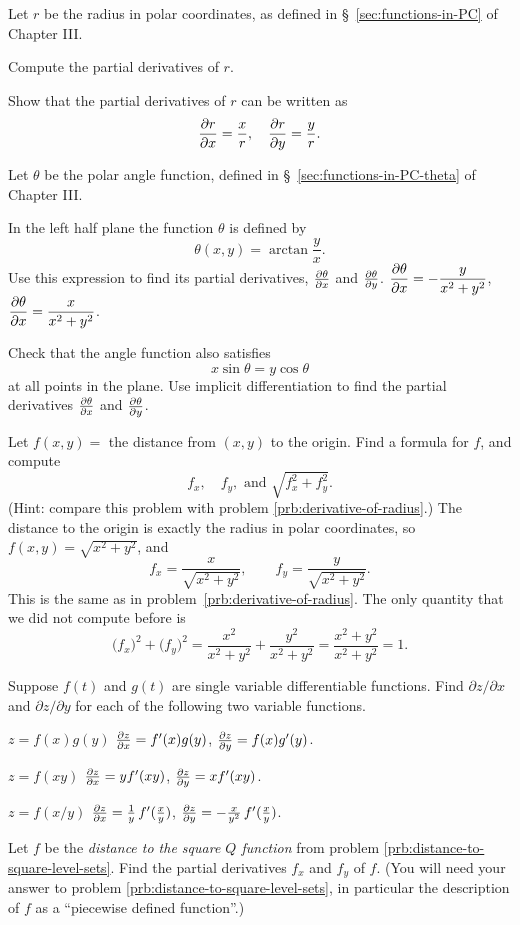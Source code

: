 \begin{multicols}{2}
\problem \label{prb:derivative-of-radius}%
Let $r$ be the radius in polar coordinates, as defined in
\S~\ref{sec:functions-in-PC} of Chapter III.

\subprob Compute the partial derivatives of $r$.

\subprob Show that the partial derivatives of $r$ can be written as
\[
\frac{\partial r}{\partial x} = \frac xr, \quad
\frac{\partial r}{\partial y} = \frac yr.
\]

\problem \label{prb:derivative-of-theta}%
Let $\theta$ be the polar angle function, defined in
\S~\ref{sec:functions-in-PC-theta} of Chapter III.

\subprob In the left half plane the function $\theta$ is defined by
\[
\theta(x,y) = \arctan\frac{y} {x}.
\]
Use this expression to find its partial derivatives, $\frac{\partial \theta}{\partial x}$ and $\frac{\partial \theta}{\partial y}$.
\answer
$\displaystyle\frac{\partial \theta}{\partial x} = -\frac{y} {x^2+y^2}$, $\displaystyle\frac{\partial \theta}{\partial x} = \frac{x} {x^2+y^2}$.
\endanswer

\subprob Check that the angle function also satisfies
\[
x\sin\theta = y\cos \theta
\]
at all points in the plane.  Use implicit differentiation to find the partial
derivatives $\frac{\partial \theta}{\partial x}$ and $\frac{\partial \theta}{\partial y}$.


\problem Let $f(x, y) = $ the distance from $(x,y)$ to the origin. 
Find a formula for $f$, and compute
\[
f_x, \quad f_y, \text{ and } \sqrt{f_x^2 +f_y^2}.
\]
(Hint: compare this problem with problem \ref{prb:derivative-of-radius}.)
\answer
The distance to the origin is exactly the radius in polar coordinates, so
$f(x, y) = \sqrt{x^2+y^2}$, and
\[
f_x = \frac{x} {\sqrt{x^2+y^2}},\qquad
f_y = \frac{y} {\sqrt{x^2+y^2}}.
\]
This is the same as in problem~\ref{prb:derivative-of-radius}.  The only
quantity that we did not compute before is
\[
\bigl(f_x\bigr)^2 + \bigl(f_y\bigr)^2 = \frac{x^2} {x^2+y^2} + \frac{y^2}
{x^2+y^2} = \frac{x^2+y^2} {x^2+y^2} = 1.
\]
\endanswer

\problem Suppose $f(t)$ and $g(t)$ are single variable differentiable 
functions.  Find $\partial z/\partial x$ and
$\partial z/\partial y$ for each of the following two variable functions.

\subprob  $z=f(x)g(y)$
\answer
$\frac{\partial z}{\partial x} = f'(x)g(y)$, 
$\frac{\partial z}{\partial y} = f(x)g'(y)$.
\endanswer

\subprob  $z=f(xy)$
\answer
$\frac{\partial z}{\partial x} = yf'(xy)$, 
$\frac{\partial z}{\partial y} = xf'(xy)$.
\endanswer

\subprob  $z=f(x/y)$
\answer
$\frac{\partial z}{\partial x} = \frac{1}{y}\, f'(\frac xy)$, 
$\frac{\partial z}{\partial y} = -\frac{x}{y^2} \, f'(\frac xy)$.
\endanswer

\problem
\label{prb:distance-to-square-partialderivs}
Let $f$ be the \emph{distance to the square $Q$ function} from
problem \ref{prb:distance-to-square-level-sets}.  Find the partial
derivatives $f_x$ and $f_y$ of $f$.  (You will need your answer to
problem \ref{prb:distance-to-square-level-sets}, in particular the
description of $f$ as a ``piecewise defined function''.)


\end{multicols}

